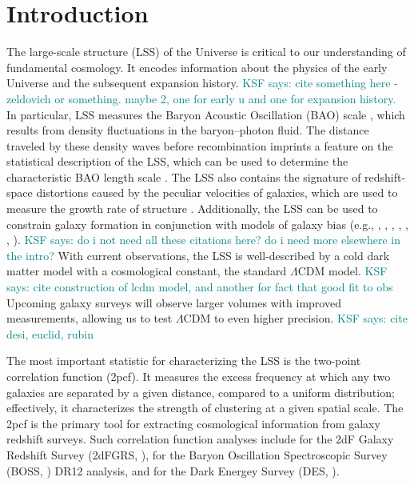 \documentclass[modern]{aastex62}
\newcommand{\cf}{2pcf\xspace} %
\newcommand{\KSF}[1]{\textcolor{teal}{KSF says: #1}}
\begin{document}
\section{Introduction}

The large-scale structure (LSS) of the Universe is critical to our understanding of fundamental cosmology. 
It encodes information about the physics of the early Universe and the subsequent expansion history. \KSF{cite something here - zeldovich or something. maybe 2, one for early u and one for expansion history.}
In particular, LSS measures the Baryon Acoustic Oscillation (BAO) scale \citep{Eisenstein2005}, which results from density fluctuations in the baryon--photon fluid.
The distance traveled by these density waves before recombination imprints a feature on the statistical description of the LSS, which can be used to determine the characteristic BAO length scale \citep{PeeblesYu1970, EisensteinHu1998}.
The LSS also contains the signature of redshift-space distortions caused by the peculiar velocities of galaxies, which are used to measure the growth rate of structure \citep{Kaiser1987}.
Additionally, the LSS can be used to constrain galaxy formation in conjunction with models of galaxy bias (e.g., \citealt{Hamilton1988}, \citealt{Budavari2003}, \citealt{Li2006}, \citealt{Abbas2006}, \citealt{Zehavi2011}, \citealt{Skibba2014}, \citealt{Durkalec2018}). \KSF{do i not need all these citations here? do i need more elsewhere in the intro?}
With current observations, the LSS is well-described by a cold dark matter model with a cosmological constant, the standard $\Lambda$CDM model. \KSF{cite construction of lcdm model, and another for fact that good fit to obs}
Upcoming galaxy surveys will observe larger volumes with improved measurements, allowing us to test $\Lambda$CDM to even higher precision. \KSF{cite desi, euclid, rubin}

The most important statistic for characterizing the LSS is the two-point correlation function (\cf).
It measures the excess frequency at which any two galaxies are separated by a given distance, compared to a uniform distribution; effectively, it characterizes the strength of clustering at a given spatial scale.
The \cf is the primary tool for extracting cosmological information from galaxy redshift surveys.
Such correlation function analyses include \cite{Hawkins2003} for the 2dF Galaxy Redshift Survey (2dFGRS, \citealt{Colless2001}), \cite{Alam2016} for the Baryon Oscillation Spectroscopic Survey (BOSS, \citealt{Dawson2013}) DR12 analysis, and \cite{Elvin-Poole2017} for the Dark Energey Survey (DES, \citealt{DES2005}).
\end{document}
